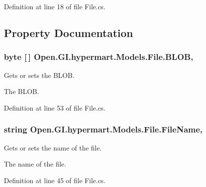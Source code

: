 Definition at line 18 of file File.\+cs.



\subsection{Property Documentation}
\hypertarget{class_open_1_1_g_i_1_1hypermart_1_1_models_1_1_file_acfdfc6e64338fc14a71994e5d7aa5111}{}
\subsubsection[{B\+L\+O\+B}]{\setlength{\rightskip}{0pt plus 5cm}byte \mbox{[}$\,$\mbox{]} Open.\+G\+I.\+hypermart.\+Models.\+File.\+B\+L\+O\+B\hspace{0.3cm}{\ttfamily [get]}, {\ttfamily [set]}}\label{class_open_1_1_g_i_1_1hypermart_1_1_models_1_1_file_acfdfc6e64338fc14a71994e5d7aa5111}


Gets or sets the B\+L\+O\+B. 

The B\+L\+O\+B. 

Definition at line 53 of file File.\+cs.

\hypertarget{class_open_1_1_g_i_1_1hypermart_1_1_models_1_1_file_a5675dd150dd5ca0de9bc6755fe6c45ad}{}
\subsubsection[{File\+Name}]{\setlength{\rightskip}{0pt plus 5cm}string Open.\+G\+I.\+hypermart.\+Models.\+File.\+File\+Name\hspace{0.3cm}{\ttfamily [get]}, {\ttfamily [set]}}\label{class_open_1_1_g_i_1_1hypermart_1_1_models_1_1_file_a5675dd150dd5ca0de9bc6755fe6c45ad}


Gets or sets the name of the file. 

The name of the file. 

Definition at line 45 of file File.\+cs.

\hypertarget{class_open_1_1_g_i_1_1hypermart_1_1_models_1_1_file_ac075b378d09c288deda822c0ea6b854c}{}
